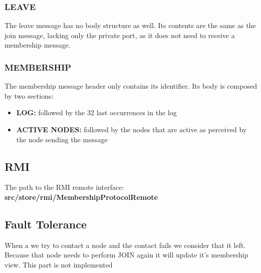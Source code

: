 \subsubsection{LEAVE}

The leave message has no body structure as well. Its contents are the same as the join message, lacking only the private port, as it does not need to receive a membership message.


\subsubsection{MEMBERSHIP}

The membership message header only contains its identifier. Its body is composed by two sections:
\begin{itemize}
    \item \textbf{LOG:} followed by the 32 last occurrences in the log 
    \item \textbf{ACTIVE NODES:} followed by the nodes that are active as perceived by the node sending the message
\end{itemize}

\subsection{RMI}

The path to the RMI remote interface: \textbf{src/store/rmi/MembershipProtocolRemote}

\subsection{Fault Tolerance}
When a we try to contact a node and the contact fails we consider that it left. Because that node needs to perform JOIN again it will update it's membership view. This part is not implemented
